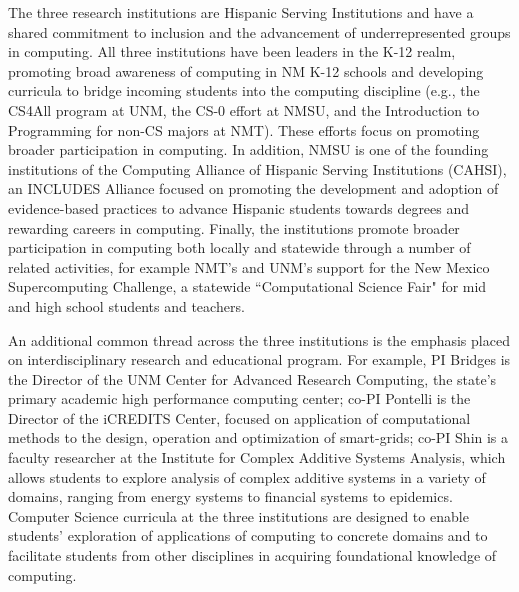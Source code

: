 The three research institutions are Hispanic Serving Institutions and have a shared commitment to inclusion and the advancement of underrepresented groups in computing.
All three institutions have been leaders in the K-12 realm, promoting broad awareness of computing in NM K-12 schools 
and developing curricula to bridge incoming students into the computing discipline (e.g., the CS4All program at UNM, the CS-0 effort at NMSU, and the Introduction to Programming for non-CS majors at NMT). These efforts focus on promoting broader participation in computing. 
In addition, NMSU is one of the founding institutions of the Computing Alliance of Hispanic Serving Institutions (CAHSI), an INCLUDES Alliance focused on promoting the development and adoption of evidence-based practices to advance Hispanic students towards degrees and rewarding careers in computing. 
Finally, the institutions promote broader participation in computing both locally and statewide through a number of related activities, for example NMT's and UNM's support for the New Mexico Supercomputing Challenge, a statewide ``Computational Science Fair" for mid and high school students and teachers.

An additional common thread across the three institutions is the emphasis placed on interdisciplinary research and educational program. For example, PI Bridges is the Director of the UNM Center for Advanced Research Computing, the state's primary academic high performance computing center; co-PI Pontelli is the Director of the iCREDITS Center, focused on application of computational methods to the design, operation and optimization of smart-grids; co-PI Shin is a faculty researcher at the Institute for Complex Additive Systems Analysis, which allows students to explore analysis of complex additive systems in a variety of domains, ranging from energy systems to financial systems to epidemics. Computer Science curricula at the three institutions are  designed to enable students' exploration of applications of computing to concrete domains and to facilitate students from other disciplines in acquiring foundational knowledge of computing. 

